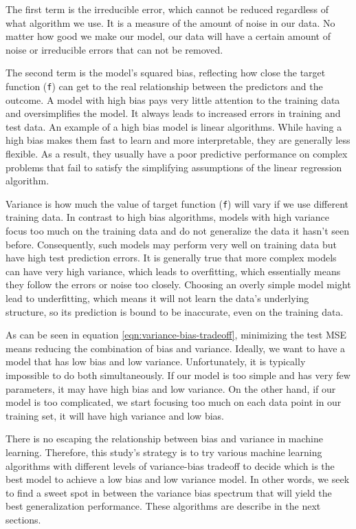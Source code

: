 The first term is the irreducible error, which cannot be reduced regardless of
what algorithm we use. It is a measure of the amount of noise in our data. No
matter how good we make our model, our data will have a certain amount of noise
or irreducible errors that can not be removed.

The second term is the model's squared bias, reflecting how close the target
function (\texttt{f}) can get to the real relationship between the predictors
and the outcome.  A model with high bias pays very little attention to the
training data and oversimplifies the model. It always leads to increased errors
in training and test data.  An example of a high bias model is linear
algorithms. While having a high bias makes them fast to learn and more
interpretable, they are generally less flexible.  As a result, they usually have
a poor predictive performance on complex problems that fail to satisfy the
simplifying assumptions of the linear regression algorithm.




Variance is how much the value of target function (\texttt{f}) will vary if we
use different training data. In contrast to high bias algorithms, models with
high variance focus too much on the training data and do not generalize the data
it hasn't seen before. Consequently, such models may perform very well on
training data but have high test prediction errors.  It is generally true that
more complex models can have very high variance, which leads to overfitting,
which essentially means they follow the errors or noise too closely.
Choosing an overly simple model might lead to underfitting, which means it will
not learn the data's underlying structure, so its prediction is bound to be
inaccurate, even on the training data.

As can be seen in equation \ref{eqn:variance-bias-tradeoff}, minimizing the test
MSE means reducing the combination of bias and variance. Ideally, we want to
have a model that has low bias and low variance. Unfortunately, it is typically
impossible to do both simultaneously. If our model is too simple and has very
few parameters, it may have high bias and low variance. On the other hand, if
our model is too complicated, we start focusing too much on each data point in
our training set, it will have high variance and low bias.

There is no escaping the relationship between bias and variance in machine
learning. Therefore, this study's strategy is to try various machine learning algorithms
with different levels of variance-bias tradeoff to decide which is the best
model to achieve a low bias and low variance model. In other words, we seek to
find a sweet spot in between the variance bias spectrum that will yield the best
generalization performance. These algorithms are describe in the next sections.

